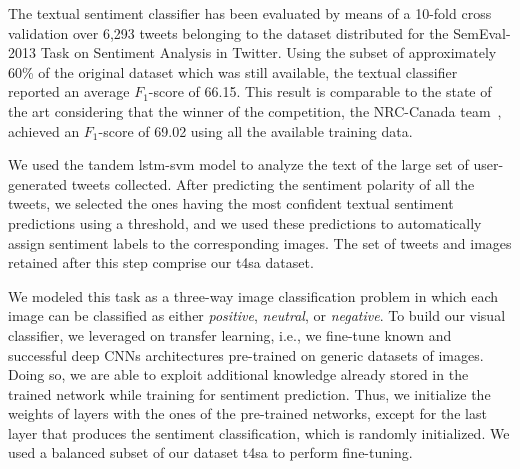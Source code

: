 The textual sentiment classifier has been evaluated by means of a 10-fold cross validation over 6,293 tweets belonging to the dataset distributed for the SemEval-2013 Task on Sentiment Analysis in Twitter.
Using the subset of approximately 60\% of the original dataset which was still available, the textual classifier reported an average $F_1$-score of 66.15.
This result is comparable to the state of the art considering that the winner of the competition, the NRC-Canada team~\cite{mohammad2013nrc}, achieved an $F_1$-score of 69.02 using all the available training data.

We used the tandem \gls{lstm}-\gls{svm} model to analyze the text of the large set of user-generated tweets collected.
After predicting the sentiment polarity of all the tweets, we selected the ones having the most confident textual sentiment predictions using a threshold, and we used these predictions to automatically assign sentiment labels to the corresponding images.
The set of tweets and images retained after this step comprise our \gls{t4sa} dataset.


We modeled this task as a three-way image classification problem in which each image can be classified as either \emph{positive}, \emph{neutral}, or \emph{negative}.
To build our visual classifier, we leveraged on transfer learning, i.e., we fine-tune known and successful deep CNNs architectures pre-trained on generic datasets of images.
Doing so, we are able to exploit additional knowledge already stored in the trained network while training for sentiment prediction.
Thus, we initialize the weights of layers with the ones of the pre-trained networks, except for the last layer that produces the sentiment classification, which is randomly initialized.
We used a balanced subset of our dataset \gls{t4sa} to perform fine-tuning.

